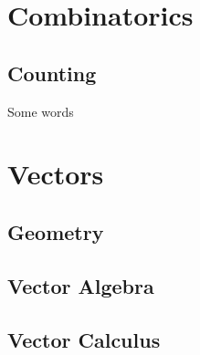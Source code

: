 \chapter{Combinatorics}
    \section{Counting}
    Some words
\chapter{Vectors}
    \section{Geometry}
    
    \section{Vector Algebra}
    
    \section{Vector Calculus}
